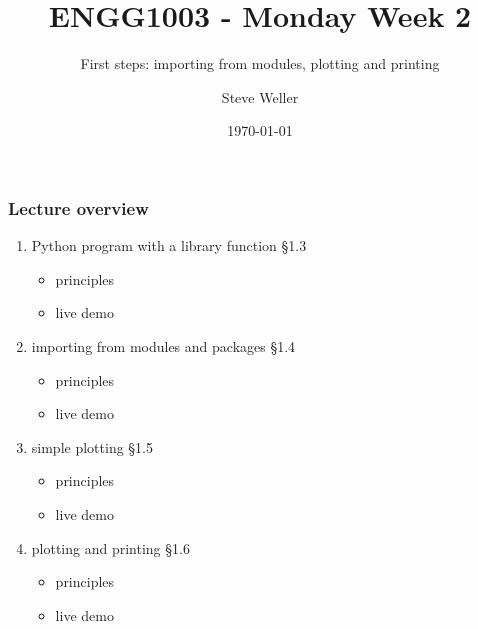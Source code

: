 \documentclass[14pt]{beamer}
\title{ENGG1003 - Monday Week 2}
\subtitle{First steps: importing from modules, plotting and printing}
\author{Steve Weller}
\institute{University of Newcastle}
\date{\today}
\newcommand\red[1]{{\color{red} #1}}
\begin{document}
\framebreak


\begin{frame}[fragile]

\frametitle{Lecture overview}
\begin{enumerate}
\item Python program with a library function \red{\S1.3}
	\begin{itemize}
		\item principles
		\item live demo
	\end{itemize}
\item importing from modules and packages \red{\S1.4}
		\begin{itemize}
		\item principles
		\item live demo
	\end{itemize}
	
\item simple plotting \red{\S1.5} 
	\begin{itemize}
			\item principles
		\item live demo
	\end{itemize}
	
\item plotting and printing \red{\S1.6}
	\begin{itemize}
	\item principles
	\item live demo
	\end{itemize}
\end{enumerate}

\end{frame}

\end{document}
